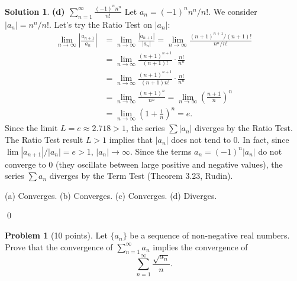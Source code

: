 \documentclass[12pt,oneside]{article}
\theoremstyle{definition}
\newtheorem{problem}{Problem}
\newtheorem*{solution}{Solution} %
\begin{document}
\begin{solution}
\medskip

\textbf{(d) $\displaystyle \sum_{n=1}^{\infty} \frac{(-1)^n n^n}{n!}$}
Let $a_n = (-1)^n n^n / n!$. We consider $|a_n| = n^n / n!$. Let's try the Ratio Test on $|a_n|$:
\begin{align*}
\lim_{n\to\infty} \left| \frac{a_{n+1}}{a_n} \right| &= \lim_{n\to\infty} \frac{|a_{n+1}|}{|a_n|} = \lim_{n\to\infty} \frac{(n+1)^{n+1}/(n+1)!}{n^n/n!} \\
&= \lim_{n\to\infty} \frac{(n+1)^{n+1}}{(n+1)!} \cdot \frac{n!}{n^n} \\
&= \lim_{n\to\infty} \frac{(n+1)^{n+1}}{(n+1)n!} \cdot \frac{n!}{n^n} \\
&= \lim_{n\to\infty} \frac{(n+1)^n}{n^n} = \lim_{n\to\infty} \left( \frac{n+1}{n} \right)^n \\
&= \lim_{n\to\infty} \left( 1 + \frac{1}{n} \right)^n = e.
\end{align*}
Since the limit $L=e \approx 2.718 > 1$, the series $\sum |a_n|$ diverges by the Ratio Test.
The Ratio Test result $L>1$ implies that $|a_n|$ does not tend to 0. In fact, since $\lim |a_{n+1}|/|a_n| = e > 1$, $|a_n| \to \infty$.
Since the terms $a_n = (-1)^n |a_n|$ do not converge to 0 (they oscillate between large positive and negative values), the series $\sum a_n$ diverges by the Term Test (Theorem 3.23, Rudin).

(a) Converges. (b) Converges. (c) Converges. (d) Diverges.
\end{solution}
\qed


\bigskip
\bigskip

\begin{problem}[10 points]
Let $\{a_n\}$ be a sequence of non-negative real numbers. 
Prove that the convergence of $\sum_{n=1}^{\infty} a_n$ implies the convergence of 
\[
\sum_{n=1}^{\infty} \frac{\sqrt{a_n}}{n}.
\]
\end{problem}
\end{document}

